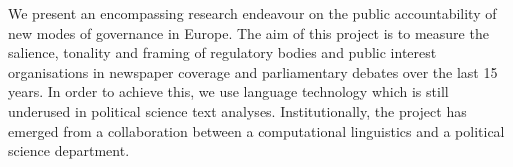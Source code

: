 We present an encompassing research endeavour on the public accountability of new modes of governance in Europe. The aim of this project is to measure the salience, tonality and framing of regulatory bodies and public interest organisations in newspaper coverage and parliamentary debates over the last 15 years. In order to achieve this, we use language technology which is still underused in political science text analyses. Institutionally, the project has emerged from a collaboration between a computational linguistics and a political science department.
